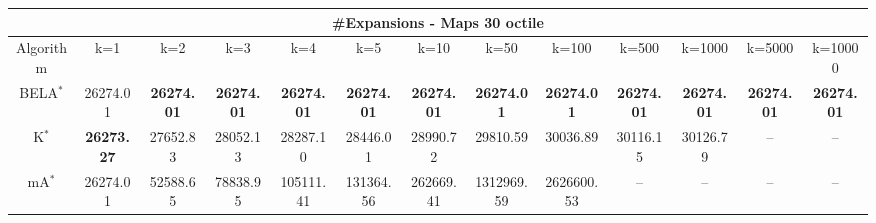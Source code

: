 \begin{tabular}{c|cccccccccccc}\toprule
\multicolumn{13}{c}{#Expansions - Maps 30 octile}\\ \midrule
Algorithm & k=1 & k=2 & k=3 & k=4 & k=5 & k=10 & k=50 & k=100 & k=500 & k=1000 & k=5000 & k=10000 \\ \midrule
BELA$^*$ & 26274.01 & \textbf{26274.01} & \textbf{26274.01} & \textbf{26274.01} & \textbf{26274.01} & \textbf{26274.01} & \textbf{26274.01} & \textbf{26274.01} & \textbf{26274.01} & \textbf{26274.01} & \textbf{26274.01} & \textbf{26274.01} \\
K$^*$ & \textbf{26273.27} & 27652.83 & 28052.13 & 28287.10 & 28446.01 & 28990.72 & 29810.59 & 30036.89 & 30116.15 & 30126.79 & -- & -- \\
mA$^*$ & 26274.01 & 52588.65 & 78838.95 & 105111.41 & 131364.56 & 262669.41 & 1312969.59 & 2626600.53 & -- & -- & -- & -- \\ \bottomrule 
\end{tabular}

